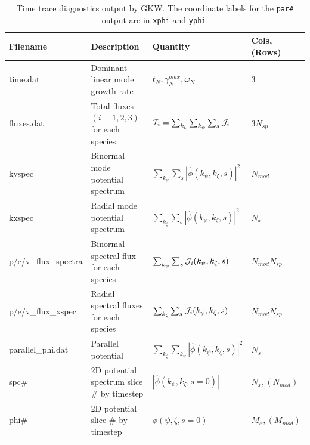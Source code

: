 \documentclass{report}
\begin{document}
\begin{table}[h!]
\begin{tabular}{l|l|l|l}
 Filename & Description & Quantity & Cols,(Rows)\\
\hline
time.dat & Dominant linear mode growth rate & $t_N, \gamma_{N}^{max}, \omega_N$ & 3  \\

fluxes.dat & Total fluxes $(i=1,2,3)$ for each species  & ${\cal I}_i=\sum_{k_\zeta} \sum_{k_\psi} \sum_{s} {\cal J}_i$  & $3N_{sp}$ \\

kyspec & Binormal mode potential spectrum &  $\sum_{k_\psi} \sum_{s} |\hat \phi(k_\psi,k_\zeta,s)|^2$    &  $N_{mod}$\\

kxspec & Radial mode potential spectrum &  $\sum_{k_\zeta} \sum_{s} |\hat \phi(k_\psi,k_\zeta,s)|^2$  & $N_x$  \\

{p/e/v}\_flux\_spectra & Binormal spectral flux for each species & $\sum_{k_\psi} \sum_{s} {\cal J}_i(k_\psi,k_\zeta,s) $ & $N_{mod}N_{sp}$ \\

{p/e/v}\_flux\_xspec  & Radial spectral fluxes for each species & $\sum_{k_\zeta} \sum_{s} {\cal J}_i(k_\psi,k_\zeta,s) $  & $N_{mod}N_{sp}$   \\

parallel\_phi.dat & Parallel  potential  & $ \sum_{k_\zeta} \sum_{k_\psi} |\hat \phi(k_\psi,k_\zeta,s)|^2$ & $N_s$        \\

spc\#     & 2D potential spectrum slice \# by timestep & $|\hat \phi(k_\psi,k_\zeta,s=0)|$ & $N_x, (N_{mod})$ \\

phi\#     & 2D potential slice \# by timestep &  $\phi(\psi,\zeta,s=0)$ & $M_x, (M_{mod})$\\

\hline
\end{tabular}
\caption{Time trace diagnostics output by GKW. The coordinate labels for the \texttt{par\#} output are in \texttt{xphi} and \texttt{yphi}.}
\end{table}
\end{document}
